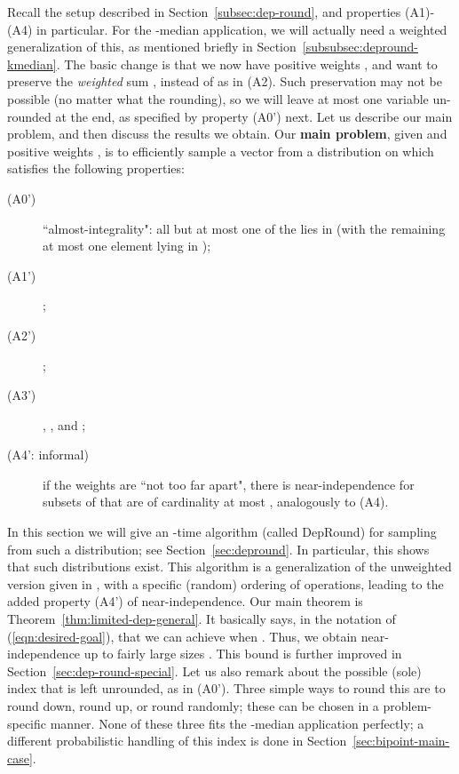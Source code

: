 \newcommand{\simplify}{\textsc{Simplify}}
\newcommand{\E}{\text{\bf E}}
\newcommand{\X}{\mathbf{X}}
\newcommand{\qavg}{\hat{q}}
\newcommand{\alphavg}{\hat{\alpha}}

Recall the setup described in Section~\ref{subsec:dep-round}, and properties (A1)-(A4) in particular. For the -median application, we will actually need a weighted generalization of this, as mentioned briefly in Section~\ref{subsubsec:depround-kmedian}. The basic change is that we now have positive weights , and want to preserve the \emph{weighted} sum , instead of  as in (A2). Such preservation may not be possible (no matter what the rounding), so we will leave at most one variable un-rounded at the end, as specified by property (A0') next. Let us describe our main problem, and then discuss the results we obtain. Our \textbf{main problem},  
given  and positive weights , is to efficiently sample a vector  from a distribution on  which satisfies the following properties:
\begin{description}
\item[(A0')] ``almost-integrality": all but at most one of the  lies in  (with the remaining at most one element lying in ); 
\item[(A1')] ;
\item[(A2')] ;
\item[(A3')] , , and 
;
\item[(A4': informal)] if the weights  are ``not too far apart", there is near-independence for subsets of  that are of cardinality at most , 
analogously to (A4). 
\end{description}

In this section we will give an -time algorithm (called {\sc DepRound}) for sampling from such a distribution; see Section~\ref{sec:depround}.
In particular, this shows that such distributions exist. This algorithm is a generalization of the unweighted version given in \cite{srin:level-sets}, with a specific (random) ordering of operations, leading to the added property (A4') of near-independence. 
Our main theorem is Theorem~\ref{thm:limited-dep-general}. 
It basically says, in the notation of (\ref{eqn:desired-goal}), that we can achieve  when 
. Thus, we obtain near-independence up to fairly large sizes . This bound is further improved in 
Section~\ref{sec:dep-round-special}. Let us also remark about the possible (sole) index  that is left unrounded, as in (A0'). Three simple ways to round this are to round down, round up, or round randomly; these can be chosen in a problem-specific manner. None of these three fits the -median application perfectly; a different probabilistic handling of this index  is done in Section~\ref{sec:bipoint-main-case}. 


